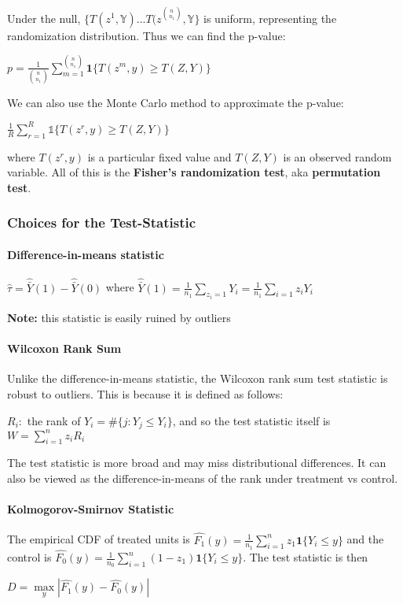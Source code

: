     Under the null, $\{T(z^1, \mathbb{Y})...T(z^{\binom{n}{n_1}}, \mathbb{Y}\}$ is uniform, representing the randomization distribution. Thus we can find the p-value:
    \begin{center} 
    $p = \frac{1}{\binom{n}{n_1}} \sum_{m=1}^{\binom{n}{n_1}} \mathbf{1}\{T(z^m,y) \geq T(Z, Y)\}$ 
    \end{center}
    We can also use the Monte Carlo method to approximate the p-value:
     \begin{center} 
     $\frac{1}{R} \sum_{r=1}^{R} \mathbb{1}\{T(z^r,y) \geq T(Z, Y)\}$ 
     \end{center}
     where $T(z^r,y) $ is a particular fixed value and $T(Z, Y)$ is an observed random variable.
     All of this is the \textbf{Fisher's randomization test}, aka \textbf{permutation test}.
     
 \subsubsection{Choices for the Test-Statistic}
 \paragraph{Difference-in-means statistic} 
$\hat{\tau} = \hat{\bar{Y}}(1) - \hat{\bar{Y}}(0)$ where $\hat{\bar{Y}}(1) = \frac{1}{n_1}\sum_{z_i=1}Y_i = \frac{1}{n_1}\sum_{i=1}z_iY_i $ 

\textbf{Note:} this statistic is easily ruined by outliers

\paragraph{Wilcoxon Rank Sum}
    Unlike the difference-in-means statistic, the Wilcoxon rank sum test statistic is robust to outliers. This is because it is defined as follows: 
    \begin{center} 
    $R_i:$ the rank of $Y_i = \#\{j: Y_j \leq Y_i\}$, and so the test statistic itself is  $W=\sum_{i=1}^{n}z_iR_i$ 
    \end{center}
    The test statistic is more broad and may miss distributional differences. It can also be viewed as the difference-in-means of the rank under treatment vs control. 

\paragraph{Kolmogorov-Smirnov Statistic}
The empirical CDF of treated units is $\hat{F_1}(y) = \frac{1}{n_1}\sum_{i=1}^n z_1 \mathbf{1}\{Y_i \leq y\}$  and the control is $\hat{F_0}(y) = \frac{1}{n_0}\sum_{i=1}^n (1-z_1) \mathbf{1}\{Y_i \leq y\}$. The test statistic is then
\begin{center} $D=\underset{y}{\max}|\hat{F_1}(y) - \hat{F_0}(y)|$ \end{center}







